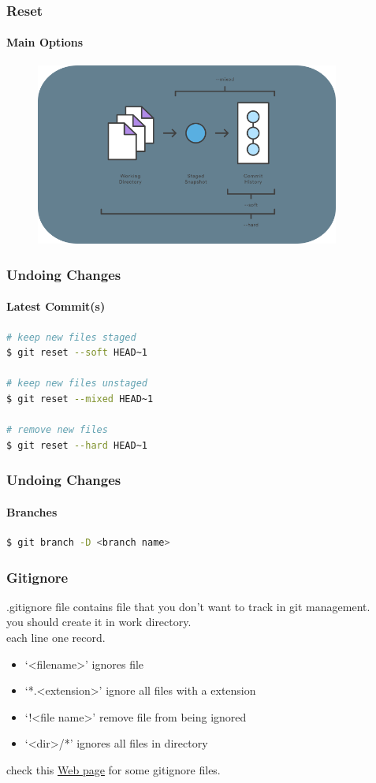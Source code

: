 \documentclass{beamer}
\begin{document}
	\begin{frame}
	\frametitle{Reset}
	\framesubtitle{Main Options}
	\begin{figure}[htbp]
			\includegraphics[width=10cm]{reset4}
	\end{figure}
	\end{frame}
	
	\begin{frame}[fragile]
		\frametitle{Undoing Changes}
		\framesubtitle{Latest Commit(s)}
		
\begin{lstlisting}[language=bash]
# keep new files staged
$ git reset --soft HEAD~1

# keep new files unstaged
$ git reset --mixed HEAD~1

# remove new files
$ git reset --hard HEAD~1
\end{lstlisting}
	\end{frame}

	\begin{frame}[fragile]
		\frametitle{Undoing Changes}
		\framesubtitle{Branches}
		
\begin{lstlisting}[language=bash]
$ git branch -D <branch name>
\end{lstlisting}
	\end{frame}
	
	\begin{frame}
		\frametitle{Gitignore}
		
		.gitignore file contains file that you don't want to track in git management.\\
		you should create it in work directory.\\
		each line one record.
		
		\begin{itemize}
			\item `<filename>' ignores file
			\item `*.<extension>' ignore all files with a extension
			\item `!<file name>' remove file from being ignored
			\item `<dir>/*' ignores all files in directory
		\end{itemize}
		
		check this \textcolor{light-primary}{\href{https://github.com/github/gitignore}{Web page}} for some gitignore files.
	\end{frame}
	
\end{document}
